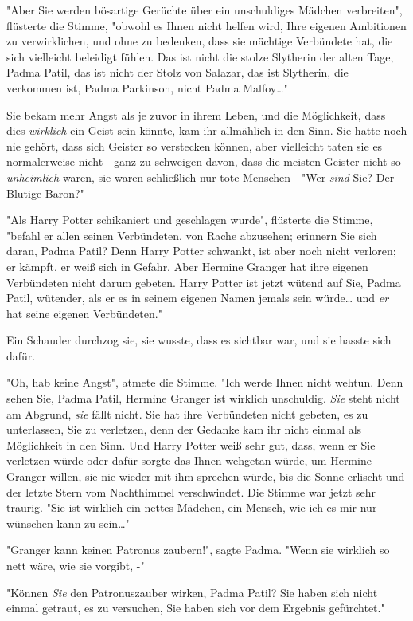 {"Aber Sie werden bösartige Gerüchte über ein unschuldiges Mädchen verbreiten", flüsterte die Stimme, "obwohl es Ihnen nicht helfen wird, Ihre eigenen Ambitionen zu verwirklichen, und ohne zu bedenken, dass sie mächtige Verbündete hat, die sich vielleicht beleidigt fühlen. Das ist nicht die stolze Slytherin der alten Tage, Padma Patil, das ist nicht der Stolz von Salazar, das ist Slytherin, die verkommen ist, Padma Parkinson, nicht Padma Malfoy…"

Sie bekam mehr Angst als je zuvor in ihrem Leben, und die Möglichkeit, dass dies \emph{wirklich} ein Geist sein könnte, kam ihr allmählich in den Sinn. Sie hatte noch nie gehört, dass sich Geister so verstecken können, aber vielleicht taten sie es normalerweise nicht - ganz zu schweigen davon, dass die meisten Geister nicht so \emph{unheimlich} waren, sie waren schließlich nur tote Menschen - "Wer \emph{sind} Sie? Der Blutige Baron?"

"Als Harry Potter schikaniert und geschlagen wurde", flüsterte die Stimme, "befahl er allen seinen Verbündeten, von Rache abzusehen; erinnern Sie sich daran, Padma Patil? Denn Harry Potter schwankt, ist aber noch nicht verloren; er kämpft, er weiß sich in Gefahr. Aber Hermine Granger hat ihre eigenen Verbündeten nicht darum gebeten. Harry Potter ist jetzt wütend auf Sie, Padma Patil, wütender, als er es in seinem eigenen Namen jemals sein würde… und \emph{er} hat seine eigenen Verbündeten."

Ein Schauder durchzog sie, sie wusste, dass es sichtbar war, und sie hasste sich dafür.

"Oh, hab keine Angst", atmete die Stimme. "Ich werde Ihnen nicht wehtun. Denn sehen Sie, Padma Patil, Hermine Granger ist wirklich unschuldig. \emph{Sie} steht nicht am Abgrund, \emph{sie} fällt nicht. Sie hat ihre Verbündeten nicht gebeten, es zu unterlassen, Sie zu verletzen, denn der Gedanke kam ihr nicht einmal als Möglichkeit in den Sinn. Und Harry Potter weiß sehr gut, dass, wenn er Sie verletzen würde oder dafür sorgte das Ihnen wehgetan würde, um Hermine Granger willen, sie nie wieder mit ihm sprechen würde, bis die Sonne erlischt und der letzte Stern vom Nachthimmel verschwindet. Die Stimme war jetzt sehr traurig. "Sie ist wirklich ein nettes Mädchen, ein Mensch, wie ich es mir nur wünschen kann zu sein…"

"Granger kann keinen Patronus zaubern!", sagte Padma. "Wenn sie wirklich so nett wäre, wie sie vorgibt, -"

"Können \emph{Sie} den Patronuszauber wirken, Padma Patil? Sie haben sich nicht einmal getraut, es zu versuchen, Sie haben sich vor dem Ergebnis gefürchtet."

}
